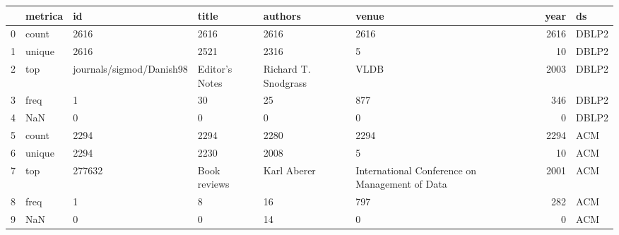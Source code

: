 \begin{tabular}{llllllrl}
\toprule
{} & metrica &                        id &           title &               authors &                                           venue &  year &     ds \\
\midrule
0 &   count &                      2616 &            2616 &                  2616 &                                            2616 &  2616 &  DBLP2 \\
1 &  unique &                      2616 &            2521 &                  2316 &                                               5 &    10 &  DBLP2 \\
2 &     top &  journals/sigmod/Danish98 &  Editor's Notes &  Richard T. Snodgrass &                                            VLDB &  2003 &  DBLP2 \\
3 &    freq &                         1 &              30 &                    25 &                                             877 &   346 &  DBLP2 \\
4 &     NaN &                         0 &               0 &                     0 &                                               0 &     0 &  DBLP2 \\
5 &   count &                      2294 &            2294 &                  2280 &                                            2294 &  2294 &    ACM \\
6 &  unique &                      2294 &            2230 &                  2008 &                                               5 &    10 &    ACM \\
7 &     top &                    277632 &    Book reviews &           Karl Aberer &  International Conference on Management of Data &  2001 &    ACM \\
8 &    freq &                         1 &               8 &                    16 &                                             797 &   282 &    ACM \\
9 &     NaN &                         0 &               0 &                    14 &                                               0 &     0 &    ACM \\
\bottomrule
\end{tabular}

